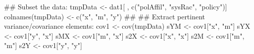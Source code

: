 \begin{Schunk}
\begin{Sinput}
 ## Subset the data:
 tmpData <- dat1[ , c("polAffil", "sysRac", "policy")]
 colnames(tmpData) <- c("x", "m", "y")
 ##
 ## Extract pertinent variance/covariance elements:
 cov1 <- cov(tmpData)
 sYM <- cov1["x", "m"]
 sYX <- cov1["y", "x"]
 sMX <- cov1["m", "x"]
 s2X <- cov1["x", "x"]
 s2M <- cov1["m", "m"]
 s2Y <- cov1["y", "y"]
\end{Sinput}
\end{Schunk}
